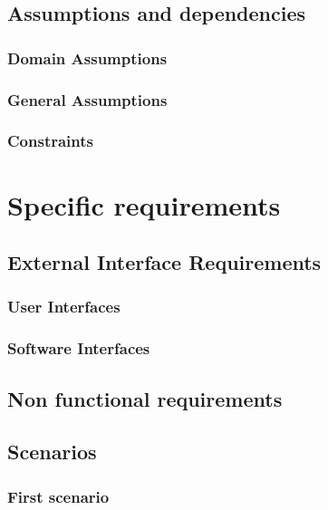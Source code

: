 \documentclass[12pt]{article}
\begin{document}
	\subsection{Assumptions and dependencies}
	\subsubsection{Domain Assumptions}
	
	
	\subsubsection{General Assumptions}
	
	\subsubsection{Constraints}
	
	
	\clearpage
	\section{Specific requirements}
	\subsection{External Interface Requirements}
	\subsubsection{User Interfaces}
	
	\subsubsection{Software Interfaces}
	
	
	\subsection{Non functional requirements}
	
	\clearpage
	\subsection{Scenarios}
	\subsubsection{First scenario}
	
	\FloatBarrier
\end{document}
